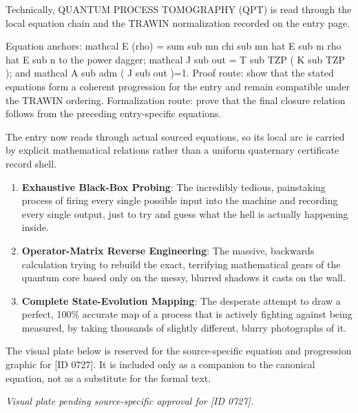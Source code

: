 Technically, QUANTUM PROCESS TOMOGRAPHY (QPT) is read through the local equation chain and the TRAWIN normalization recorded on the entry page.

Equation anchors: mathcal E (rho) = sum sub mn chi sub mn hat E sub m rho hat E sub n to the power dagger; mathcal J sub out = T sub TZP ( K sub TZP ); and mathcal A sub adm ( J sub out )=1. Proof route: show that the stated equations form a coherent progression for the entry and remain compatible under the TRAWIN ordering. Formalization route: prove that the final closure relation follows from the preceding entry-specific equations.

The entry now reads through actual sourced equations, so its local arc is carried by explicit mathematical relations rather than a uniform quaternary certificate record shell.
\endgroup

\begin{enumerate}[leftmargin=1.6em,itemsep=6pt,topsep=4pt]
\item \textbf{Exhaustive Black-Box Probing}: The incredibly tedious, painstaking process of firing every single possible input into the machine and recording every single output, just to try and guess what the hell is actually happening inside.
\item \textbf{Operator-Matrix Reverse Engineering}: The massive, backwards calculation trying to rebuild the exact, terrifying mathematical gears of the quantum core based only on the messy, blurred shadows it casts on the wall.
\item \textbf{Complete State-Evolution Mapping}: The desperate attempt to draw a perfect, 100\% accurate map of a process that is actively fighting against being measured, by taking thousands of slightly different, blurry photographs of it.
\end{enumerate}

\begingroup\footnotesize\sloppy
The visual plate below is reserved for the source-specific equation and progression graphic for [ID 0727]. It is included only as a companion to the canonical equation, not as a substitute for the formal text.
\par\endgroup
\begingroup\footnotesize\itshape
Visual plate pending source-specific approval for [ID 0727].
\par\endgroup

